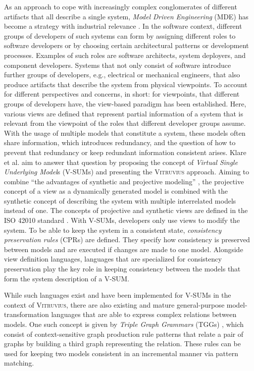 As an approach to cope with increasingly complex conglomerates of different artifacts that all describe a single system, \emph{Model Driven Engineering} (MDE) \cite{kent_model_2002} has become a strategy with industrial relevance \cite{hutchinson_model-driven_2011, hutchinson_model-driven_2014, whittle_state_2014}.
In the software context, different groups of developers of such systems can form by assigning different roles to software developers or by choosing certain architectural patterns or development processes. Examples of such roles are software architects, system deployers, and component developers. Systems that not only consist of software introduce further groups of developers, e.g., electrical or mechanical engineers, that also produce artifacts that describe the system from physical viewpoints.
To account for different perspectives and concerns, in short: for viewpoints, that different groups of developers have, the view-based paradigm has been established. Here, various views are defined that represent partial information of a system that is relevant from the viewpoint of the roles that different developer groups assume.
With the usage of multiple models that constitute a system, these models often share information, which introduces redundancy, and the question of how to prevent that redundancy or keep redundant information consistent arises.
Klare et al. \cite{VitruviusKlare2021} aim to answer that question by proposing the concept of \emph{Virtual Single Underlying Model}s (V-SUMs) and presenting the \textsc{Vitruvius} approach.
Aiming to combine \enquote{the advantages of synthetic and projective modeling}  \cite{VitruviusKlare2021}, the projective concept of a view as a dynamically generated model is combined with the synthetic concept of describing the system with multiple interrelated models instead of one. The concepts of projective and synthetic views are defined in the ISO 42010 standard \cite{iso_42010}.
With V-SUMs, developers only use views to modify the system.
To be able to keep the system in a consistent state, \emph{consistency preservation rules} (CPRs) are defined.
They specify how consistency is preserved between models and are executed if changes are made to one model. 
Alongside view definition languages, languages that are specialized for consistency preservation play the key role in keeping consistency between the models that form the system description of a V-SUM.

While such languages exist and have been implemented for V-SUMs in the context of \textsc{Vitruvius}, there are also existing and mature \cite{fritsche_short-cut-theoretical_2018, fritsche_higher_order_short_cut_rules_2023} general-purpose model-transformation languages that are able to express complex relations between models. One such concept is given by \emph{Triple Graph Grammars} (TGGs) \cite{schurr_tggs_1995}, which consist of context-sensitive graph production rule patterns that relate a pair of graphs by building a third graph representing the relation. These rules can be used for keeping two models consistent in an incremental manner via pattern matching.

